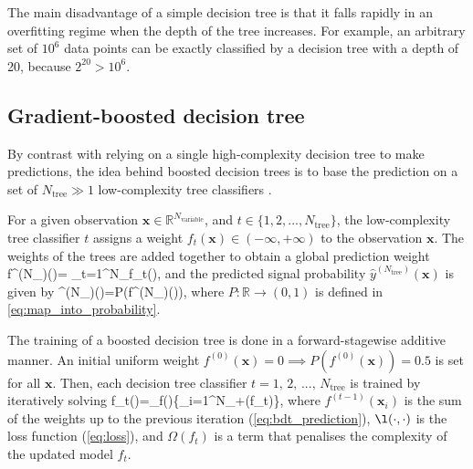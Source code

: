 The main disadvantage of a simple decision tree is that it falls rapidly in an overfitting regime when the depth of the tree increases.
For example, an arbitrary set of $10^6$ data points can be exactly classified by a decision tree with a depth of 20, because $2^{20}>10^6$.
\subsection{Gradient-boosted decision tree} \label{sec:dt_bdt}
By contrast with relying on a single high-complexity decision tree to make predictions, the idea behind boosted decision trees is to base the prediction on a set of $N_{\mathrm{tree}}\gg 1$ low-complexity tree classifiers \cite{Friedman:2002we, Chen:2016:XST:2939672.2939785}.

For a given observation $\mathbf{x}\in\mathbb{R}^{N_{\mathrm{variable}}}$, and $t\in\{1,2,...,N_{\mathrm{tree}}\}$, the low-complexity tree classifier $t$ assigns a weight $f_t(\mathbf{x})\in(-\infty,+\infty)$ to the observation $\mathbf{x}$.
The weights of the trees are added together to obtain a global prediction weight
\be \label{eq:bdt_prediction}
f^{(N_{})}()=
\sum_{t=1}^{N_{}}f_t(),
\ee
and the predicted signal probability $\hat{y}^{(N_{\mathrm{tree}})}(\mathbf{x})$ is given by
\be
{}^{(N_{})}()=P\left(f^{(N_{})}()\right),
\ee
where $P:\mathbb{R}\rightarrow(0,1)$ is defined in \cref{eq:map_into_probability}.

The training of a boosted decision tree is done in a forward-stagewise additive manner.
An initial uniform weight $f^{(0)}(\mathbf{x})=0\implies P(f^{(0)}(\mathbf{x}))=0.5$ is set for all $\mathbf{x}$.
Then, each decision tree classifier $t=1,\,2,\,...,\,N_{\mathrm{tree}}$ is trained by iteratively solving \cite{Chen:2016:XST:2939672.2939785}
\be \label{eq:bdt_training}
f_t()=\min_{f()}\left\{\sum_{i=1}^{N_{}}\ell{}+\Omega(f_t)\right\},
\ee
where $f^{(t-1)}(\mathbf{x}_i)$ is the sum of the weights up to the previous iteration (\cref{eq:bdt_prediction}), $\l(\cdot,\cdot)$ is the loss function (\cref{eq:loss}), and $\Omega(f_t)$ is a term that penalises the complexity of the updated model $f_t$.


